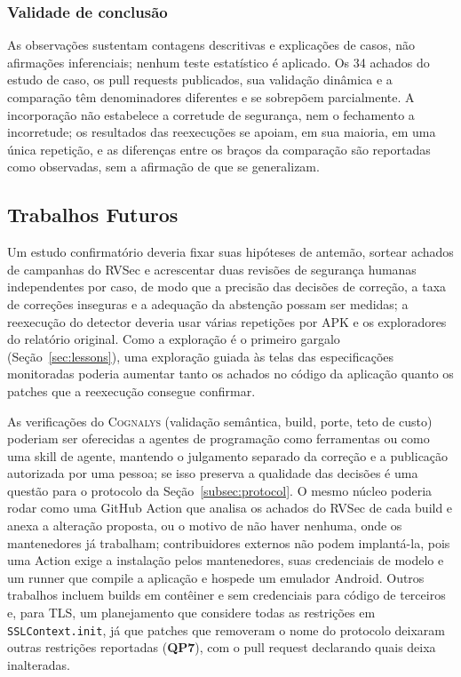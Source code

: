 \documentclass[conference]{IEEEtran}
\newcommand{\system}{\textsc{Cognalys}}
\newcommand{\researchq}[1]{\textbf{QP#1}}
\begin{document}
\subsubsection{Validade de conclusão}

As observações sustentam contagens descritivas e explicações de casos, não
afirmações inferenciais; nenhum teste estatístico é aplicado. Os 34 achados do
estudo de caso, os pull requests publicados, sua validação dinâmica e a
comparação têm denominadores diferentes e se sobrepõem parcialmente. A incorporação
não estabelece a corretude de segurança, nem o fechamento a incorretude; os resultados das
reexecuções se apoiam, em sua maioria, em uma única repetição, e as diferenças entre os braços
da comparação são reportadas como observadas, sem a afirmação de que se generalizam.

\subsection{Trabalhos Futuros}
\label{subsec:future}

Um estudo confirmatório deveria fixar suas hipóteses de antemão, sortear achados
de campanhas do RVSec e acrescentar duas revisões de segurança humanas independentes
por caso, de modo que a precisão das decisões de correção, a taxa de correções inseguras e
a adequação da abstenção possam ser medidas; a reexecução do detector deveria
usar várias repetições por APK e os exploradores do relatório original. Como
a exploração é o primeiro gargalo (Seção~\ref{sec:lessons}), uma exploração guiada
às telas das especificações monitoradas poderia aumentar tanto os achados no código
da aplicação quanto os patches que a reexecução consegue confirmar.

As verificações do \system{} (validação semântica, build, porte, teto de custo) poderiam ser
oferecidas a agentes de programação como ferramentas ou como uma skill de agente, mantendo o julgamento separado
da correção e a publicação autorizada por uma pessoa; se isso preserva a qualidade das
decisões é uma questão para o protocolo da Seção~\ref{subsec:protocol}. O mesmo núcleo poderia rodar como uma GitHub
Action que analisa os achados do RVSec de cada build e anexa a alteração
proposta, ou o motivo de não haver nenhuma, onde os mantenedores já trabalham;
contribuidores externos não podem implantá-la, pois uma Action exige a instalação pelos
mantenedores, suas credenciais de modelo e um runner que compile a aplicação e hospede
um emulador Android. Outros trabalhos incluem builds em contêiner e sem credenciais
para código de terceiros e, para TLS, um planejamento que considere todas as restrições
em \texttt{SSLContext.init}, já que patches que removeram o nome do protocolo deixaram
outras restrições reportadas (\researchq{7}), com o pull request declarando quais
deixa inalteradas.
\end{document}
